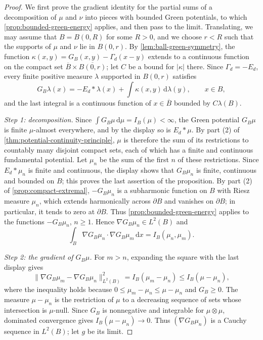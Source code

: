 \begin{proof}
We first prove the gradient identity for the partial sums of a decomposition of $\mu$ and $\nu$ into pieces with bounded Green potentials, to which \cref{prop:bounded-green-energy} applies, and then pass to the limit. Translating, we may assume that $B=B(0,R)$ for some $R>0$, and we choose $r<R$ such that the supports of $\mu$ and $\nu$ lie in $B(0,r)$. By \cref{lem:ball-green-symmetry}, the function $\kappa(x,y)=G_B(x,y)-\Gamma_d(x-y)$ extends to a continuous function on the compact set $\overline B\times\overline{B(0,r)}$; let $C$ be a bound for $|\kappa|$ there. Since $\Gamma_d=-E_d$, every finite positive measure $\lambda$ supported in $B(0,r)$ satisfies
\[
 G_B\lambda(x)=-E_d*\lambda(x)+\int\kappa(x,y)\,\mathrm d\lambda(y),\qquad x\in B,
\]
and the last integral is a continuous function of $x\in\overline B$ bounded by $C\lambda(B)$.

\emph{Step 1: decomposition.} Since $\int G_B\mu\,\mathrm d\mu=I_B(\mu)<\infty$, the Green potential $G_B\mu$ is finite $\mu$-almost everywhere, and by the display so is $E_d*\mu$. By part (2) of \cref{thm:potential-continuity-principle}, $\mu$ is therefore the sum of its restrictions to countably many disjoint compact sets, each of which has a finite and continuous fundamental potential. Let $\mu_n$ be the sum of the first $n$ of these restrictions. Since $E_d*\mu_n$ is finite and continuous, the display shows that $G_B\mu_n$ is finite, continuous and bounded on $B$; this proves the last assertion of the proposition. By part (2) of \cref{prop:compact-extremal}, $-G_B\mu_n$ is a subharmonic function on $B$ with Riesz measure $\mu_n$, which extends harmonically across $\partial B$ and vanishes on $\partial B$; in particular, it tends to zero at $\partial B$. Thus \cref{prop:bounded-green-energy} applies to the functions $-G_B\mu_n$, $n\geq1$. Hence $\nabla G_B\mu_n\in L^2(B)$ and
\[
 \int_B\nabla G_B\mu_n\mathbin{\cdot}\nabla G_B\mu_m\,\mathrm d x=I_B(\mu_n,\mu_m).
\]

\emph{Step 2: the gradient of $G_B\mu$.} For $m>n$, expanding the square with the last display gives
\[
 \|\nabla G_B\mu_m-\nabla G_B\mu_n\|_{L^2(B)}^2=I_B(\mu_m-\mu_n)\leq I_B(\mu-\mu_n),
\]
where the inequality holds because $0\leq\mu_m-\mu_n\leq\mu-\mu_n$ and $G_B\geq0$. The measure $\mu-\mu_n$ is the restriction of $\mu$ to a decreasing sequence of sets whose intersection is $\mu$-null. Since $G_B$ is nonnegative and integrable for $\mu\otimes\mu$, dominated convergence gives $I_B(\mu-\mu_n)\to0$. Thus $(\nabla G_B\mu_n)$ is a Cauchy sequence in $L^2(B)$; let $g$ be its limit.


\end{proof}
